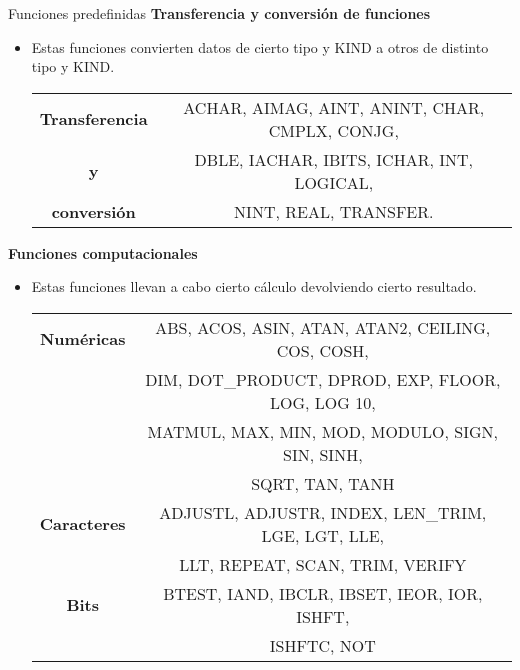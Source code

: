 \begin{frame}[fragile]{Funciones predefinidas}
 \textbf{Transferencia y conversión de funciones}
 \begin{itemize}[<+(1)->]
  \item Estas funciones convierten datos de cierto tipo y KIND a otros de distinto tipo y KIND.
   \vspace{0.1cm}
   \begin{table}[]
    \centering
    \label{Tabla_funciones_transfyconvers}
    \resizebox{9cm}{!} {
      \begin{tabular}{|c|c|}
        \hline
        \textbf{Transferencia}  & ACHAR, AIMAG, AINT, ANINT, CHAR, CMPLX, CONJG,\\        
        \textbf{y}              & DBLE, IACHAR, IBITS, ICHAR, INT, LOGICAL,     \\                   
        \textbf{conversión}     & NINT, REAL, TRANSFER.                         \\ \hline
      \end{tabular}}
    \end{table}
  \end{itemize}
 \textbf{Funciones computacionales}
 \begin{itemize}[<+(2)->]
  \item Estas funciones llevan a cabo cierto cálculo devolviendo cierto resultado.
    \vspace{0.1cm}
    \begin{table}[]
    \centering
    \label{Tabla_funciones_computacionales}
    \resizebox{9cm}{!} {
      \begin{tabular}{|c|c|}
        \hline
        \textbf{Numéricas}     & ABS, ACOS, ASIN, ATAN, ATAN2, CEILING, COS, COSH,   \\
                               & DIM, DOT\_PRODUCT, DPROD, EXP, FLOOR, LOG, LOG 10,  \\
                               & MATMUL, MAX, MIN, MOD, MODULO, SIGN, SIN, SINH,     \\
                               & SQRT, TAN, TANH                                     \\ \hline       
        \textbf{Caracteres}    & ADJUSTL, ADJUSTR, INDEX, LEN\_TRIM, LGE, LGT, LLE,  \\
                               & LLT, REPEAT, SCAN, TRIM, VERIFY                     \\ \hline                      
        \textbf{Bits}          & BTEST, IAND, IBCLR, IBSET, IEOR, IOR, ISHFT,        \\
                               & ISHFTC, NOT                                         \\ \hline    
      \end{tabular}}
    \end{table}
  \end{itemize}
\end{frame}

